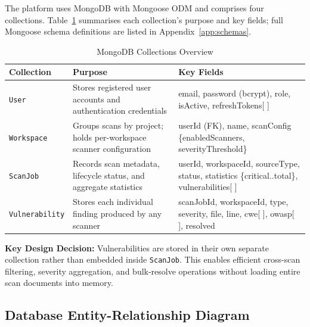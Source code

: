 \documentclass[12pt,a4paper]{report}
\begin{document}
The platform uses MongoDB with Mongoose ODM and comprises four collections. Table~\ref{tab:db_collections} summarises each collection's purpose and key fields; full Mongoose schema definitions are listed in Appendix~\ref{app:schemas}.

\begin{table}[H]
\centering
\caption{MongoDB Collections Overview}
\label{tab:db_collections}
\begin{tabular}{|p{2.8cm}|p{5.0cm}|p{5.5cm}|}
\hline
\textbf{Collection} & \textbf{Purpose} & \textbf{Key Fields} \\
\hline
\texttt{User} & Stores registered user accounts and authentication credentials & email, password (bcrypt), role, isActive, refreshTokens[ ] \\
\hline
\texttt{Workspace} & Groups scans by project; holds per-workspace scanner configuration & userId (FK), name, scanConfig \{enabledScanners, severityThreshold\} \\
\hline
\texttt{ScanJob} & Records scan metadata, lifecycle status, and aggregate statistics & userId, workspaceId, sourceType, status, statistics \{critical..total\}, vulnerabilities[ ] \\
\hline
\texttt{Vulnerability} & Stores each individual finding produced by any scanner & scanJobId, workspaceId, type, severity, file, line, cwe[ ], owasp[ ], resolved \\
\hline
\end{tabular}
\end{table}

\textbf{Key Design Decision:} Vulnerabilities are stored in their own separate collection rather than embedded inside \texttt{ScanJob}. This enables efficient cross-scan filtering, severity aggregation, and bulk-resolve operations without loading entire scan documents into memory.

\subsection{Database Entity-Relationship Diagram}
\end{document}
